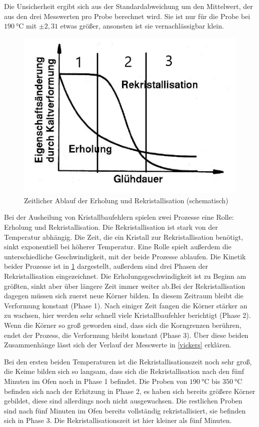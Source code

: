 \documentclass[
	a4paper,
	12pt,
	pagesize,
	ngerman
]{scrartcl}
\begin{document}
Die Unsicherheit ergibt sich aus der Standardabweichung um den Mittelwert, der aus den drei Messwerten pro Probe berechnet wird. Sie ist nur für die Probe bei $\SI{190}{\degreeCelsius}$ mit $\pm2,31$ etwas größer, ansonsten ist sie vernachlässigbar klein.

\begin{figure}[h]
	\centering
	\includegraphics[scale=1]{grafik1.png}
	\caption{Zeitlicher Ablauf der Erholung und Rekristallisation (schematisch)}
	\label{grafik}
\end{figure}

Bei der Ausheilung von Kristallbaufehlern spielen zwei Prozesse eine Rolle: Erholung und Rekristallisation. Die Rekristallisation ist stark von der Temperatur abhängig. Die Zeit, die ein Kristall zur Rekristallisation benötigt, sinkt exponentiell bei höherer Temperatur. Eine Rolle spielt außerdem die unterschiedliche Geschwindigkeit, mit der beide Prozesse ablaufen. Die Kinetik beider Prozesse ist in \cref{grafik} dargestellt, außerdem sind drei Phasen der Rekristallisation eingezeichnet. Die Erholungsgeschwindigkeit ist zu Beginn am größten, sinkt aber über längere Zeit immer weiter ab.Bei der Rekristallisation dagegen müssen sich zuerst neue Körner bilden. In diesem Zeitraum bleibt die Verformung konstant (Phase 1). Nach einiger Zeit fangen die Körner stärker an zu wachsen, hier werden sehr schnell viele Kristallbaufehler berichtigt (Phase 2). Wenn die Körner so groß geworden sind, dass sich die Korngrenzen berühren, endet der Prozess, die Verformung bleibt konstant (Phase 3). Über diese beiden Zusammenhänge lässt sich der Verlauf der Messwerte in \cref{vickers} erklären.

Bei den ersten beiden Temperaturen ist die Rekristallisationszeit noch sehr groß, die Keime bilden sich so langsam, dass sich die Rekristallisation nach den fünf Minuten im Ofen noch in Phase 1 befindet. Die Proben von $\SI{190}{\degreeCelsius}$ bis $\SI{350}{\degreeCelsius}$ befinden sich nach der Erhitzung in Phase 2, es haben sich bereits größere Körner gebildet, diese sind allerdings noch nicht ausgewachsen. Die restlichen Proben sind nach fünf Minuten im Ofen bereits vollständig rekristallisiert, sie befinden sich in Phase 3. Die Rekristallisationszeit ist hier kleiner als fünf Minuten.
\end{document}
